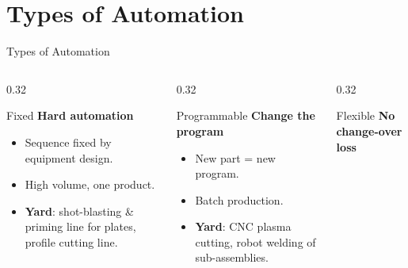 \documentclass[aspectratio=169]{beamer}
\begin{document}
	\section{Types of Automation}
	\begin{frame}{Types of Automation}
		\begin{columns}[T]
			\begin{column}{0.32\textwidth}
				\begin{block}{Fixed}
					\centering
					\textbf{Hard automation}

					\vspace{0.2cm}

					\begin{itemize}\small
						\item Sequence fixed by equipment design.
						\item High volume, one product.
						\item \textbf{Yard}: shot-blasting \& priming line for plates, profile cutting line.
					\end{itemize}
				\end{block}
			\end{column}
			\begin{column}{0.32\textwidth}
				\begin{block}{Programmable}
					\centering
					\textbf{Change the program}

					\vspace{0.2cm}

					\begin{itemize}\small
						\item New part = new program.
						\item Batch production.
						\item \textbf{Yard}: CNC plasma cutting, robot welding of sub-assemblies.
					\end{itemize}
				\end{block}
			\end{column}
			\begin{column}{0.32\textwidth}
				\begin{block}{Flexible}
					\centering
					\textbf{No change-over loss}

					\vspace{0.2cm}


\end{block}
\end{column}
\end{columns}
\end{frame}
\end{document}

